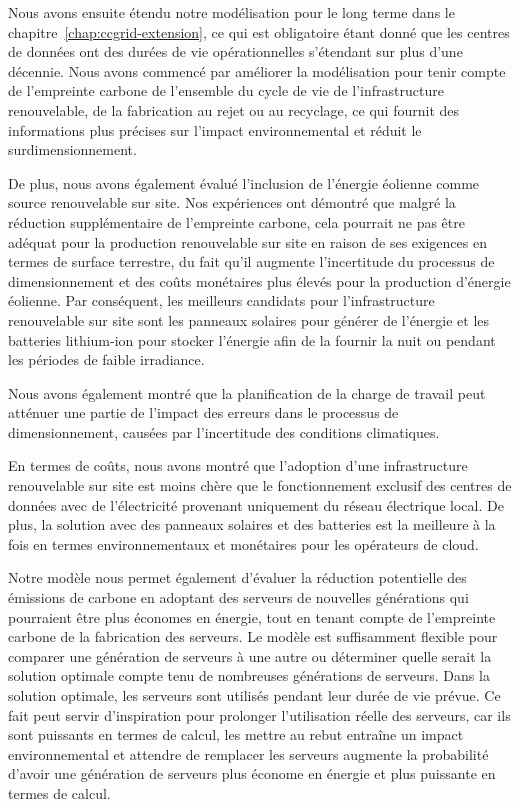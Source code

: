 Nous avons ensuite étendu notre modélisation pour le long terme dans le chapitre~\ref{chap:ccgrid-extension}, ce qui est obligatoire étant donné que les centres de données ont des durées de vie opérationnelles s'étendant sur plus d'une décennie. Nous avons commencé par améliorer la modélisation pour tenir compte de l'empreinte carbone de l'ensemble du cycle de vie de l'infrastructure renouvelable, de la fabrication au rejet ou au recyclage, ce qui fournit des informations plus précises sur l'impact environnemental et réduit le surdimensionnement.


De plus, nous avons également évalué l'inclusion de l'énergie éolienne comme source renouvelable sur site. Nos expériences ont démontré que malgré la réduction supplémentaire de l'empreinte carbone, cela pourrait ne pas être adéquat pour la production renouvelable sur site en raison de ses exigences en termes de surface terrestre, du fait qu'il augmente l'incertitude du processus de dimensionnement et des coûts monétaires plus élevés pour la production d'énergie éolienne. Par conséquent, les meilleurs candidats pour l'infrastructure renouvelable sur site sont les panneaux solaires pour générer de l'énergie et les batteries lithium-ion pour stocker l'énergie afin de la fournir la nuit ou pendant les périodes de faible irradiance.


Nous avons également montré que la planification de la charge de travail peut atténuer une partie de l'impact des erreurs dans le processus de dimensionnement, causées par l'incertitude des conditions climatiques.


En termes de coûts, nous avons montré que l'adoption d'une infrastructure renouvelable sur site est moins chère que le fonctionnement exclusif des centres de données avec de l'électricité provenant uniquement du réseau électrique local. De plus, la solution avec des panneaux solaires et des batteries est la meilleure à la fois en termes environnementaux et monétaires pour les opérateurs de cloud.


Notre modèle nous permet également d'évaluer la réduction potentielle des émissions de carbone en adoptant des serveurs de nouvelles générations qui pourraient être plus économes en énergie, tout en tenant compte de l'empreinte carbone de la fabrication des serveurs. Le modèle est suffisamment flexible pour comparer une génération de serveurs à une autre ou déterminer quelle serait la solution optimale compte tenu de nombreuses générations de serveurs. Dans la solution optimale, les serveurs sont utilisés pendant leur durée de vie prévue. Ce fait peut servir d'inspiration pour prolonger l'utilisation réelle des serveurs, car ils sont puissants en termes de calcul, les mettre au rebut entraîne un impact environnemental et attendre de remplacer les serveurs augmente la probabilité d'avoir une génération de serveurs plus économe en énergie et plus puissante en termes de calcul.



